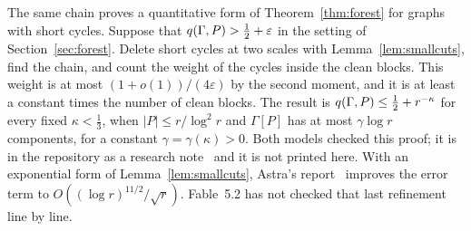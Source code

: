 \begin{remark}\label{rem:polynomial}
The same chain proves a quantitative form of Theorem~\ref{thm:forest} for graphs with short cycles.
Suppose that $q(\Gamma,P)>\tfrac12+\varepsilon$ in the setting of Section~\ref{sec:forest}. Delete
short cycles at two scales with Lemma~\ref{lem:smallcuts}, find the chain, and count the weight of
the cycles inside the clean blocks. This weight is at most $(1+o(1))/(4\varepsilon)$ by the second
moment, and it is at least a constant times the number of clean blocks. The result is
$q(\Gamma,P)\le\tfrac12+r^{-\kappa}$ for every fixed $\kappa<\frac13$, when $|P|\le r/\log^{2}r$ and
$\Gamma[P]$ has at most $\gamma\log r$ components, for a constant $\gamma=\gamma(\kappa)>0$. Both
models checked this proof; it is in the repository as a research note~\cite{S4} and it is not
printed here. With an exponential form of Lemma~\ref{lem:smallcuts}, Astra's report~\cite{S4}
improves the error term to $O((\log r)^{11/2}/\sqrt r)$. Fable~5.2 has not checked that last
refinement line by line.
\end{remark}
